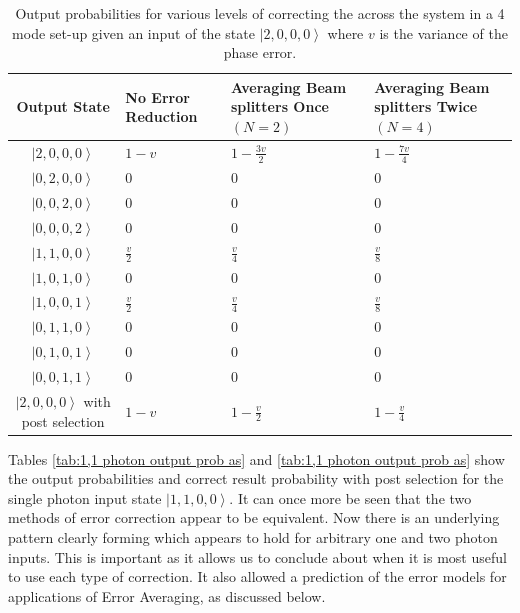 \documentclass[aps,pra,twocolumn,superscriptaddress,numerical]{revtex4-1}
\begin{document}
\begin{widetext}
\begin{table}
{		\begin{centering}
			\begin{tabular}{|c|>{\centering}p{4cm}|>{\centering}p{4cm}|>{\centering}p{4cm}|}
				\hline 
				Output State & No Error Reduction & Averaging Beam splitters Once $\left(N=2\right)$ & Averaging Beam splitters Twice $\left(N=4\right)$\tabularnewline
				\hline 
				\hline 
				$\left|2,0,0,0\right\rangle $ & $1-v$ & $1-\frac{3v}{2}$ & $1-\frac{7v}{4}$\tabularnewline
				\hline 
				$\left|0,2,0,0\right\rangle $ & $0$ & $0$ & $0$\tabularnewline
				\hline 
				$\left|0,0,2,0\right\rangle $ & $0$ & $0$ & $0$\tabularnewline
				\hline 
				$\left|0,0,0,2\right\rangle $ & $0$ & $0$ & $0$\tabularnewline
				\hline 
				$\left|1,1,0,0\right\rangle $ & $\frac{v}{2}$ & $\frac{v}{4}$ & $\frac{v}{8}$\tabularnewline
				\hline 
				$\left|1,0,1,0\right\rangle $ & $0$ & $0$ & $0$\tabularnewline
				\hline 
				$\left|1,0,0,1\right\rangle $ & $\frac{v}{2}$ & $\frac{v}{4}$ & $\frac{v}{8}$\tabularnewline
				\hline 
				$\left|0,1,1,0\right\rangle $ & $0$ & $0$ & $0$\tabularnewline
				\hline 
				$\left|0,1,0,1\right\rangle $ & $0$ & $0$ & $0$\tabularnewline
				\hline 
				$\left|0,0,1,1\right\rangle $ & $0$ & $0$ & $0$\tabularnewline
				\hline 
				$\left|2,0,0,0\right\rangle $ with post selection & $1-v$ & $1-\frac{v}{2}$ & $1-\frac{v}{4}$\tabularnewline
				\hline 
			\end{tabular}
			\par\end{centering}
		
	}
	
	\caption[Output probabilities for various levels of correcting the across the
	system in a 4 mode set-up given an input of the state $\left|2,0,0,0\right\rangle $.]{Output probabilities for various levels of correcting the across
		the system in a 4 mode set-up given an input of the state $\left|2,0,0,0\right\rangle $
		where $v$ is the variance of the phase error. \label{tab:2 photon output prob as}}
\end{table}


Tables \ref{tab:1,1 photon output prob as} and \ref{tab:1,1 photon output prob as}
show the output probabilities and correct result probability with
post selection for the single photon input state $\left|1,1,0,0\right\rangle $.
It can once more be seen that the two methods of error correction
appear to be equivalent. Now there is an underlying pattern clearly
forming which appears to hold for arbitrary one and two photon inputs.
This is important as it allows us to conclude about when it is most
useful to use each type of correction. It also allowed a prediction
of the error models for applications of Error Averaging, as discussed
below.


\end{widetext}
\end{document}

